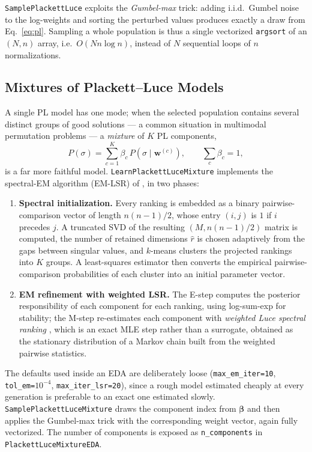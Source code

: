 \documentclass[a4paper,11pt]{article}
\begin{document}
\texttt{SamplePlackettLuce} exploits the \emph{Gumbel-max} trick: adding i.i.d.\
Gumbel noise to the log-weights and sorting the perturbed values produces exactly
a draw from Eq.~\eqref{eq:pl}.  Sampling a whole population is thus a single
vectorized \texttt{argsort} of an $(N,n)$ array, i.e.\ $O(Nn\log n)$, instead of
$N$ sequential loops of $n$ normalizations.

\subsection{Mixtures of Plackett--Luce Models}

A single PL model has one mode; when the selected population contains several
distinct groups of good solutions --- a common situation in multimodal
permutation problems --- a \emph{mixture} of $K$ PL components,
\begin{equation}
P(\sigma) = \sum_{c=1}^{K} \beta_c \, P(\sigma \mid \mathbf{w}^{(c)}), \qquad
\sum_c \beta_c = 1 ,
\end{equation}
is a far more faithful model.  \texttt{LearnPlackettLuceMixture} implements the
spectral-EM algorithm (EM-LSR) of \cite{Nguyen_and_Zhang:2023}, in two phases:

\begin{enumerate}
  \item \textbf{Spectral initialization.}  Every ranking is embedded as a binary
    pairwise-comparison vector of length $n(n-1)/2$, whose entry $(i,j)$ is $1$
    if $i$ precedes $j$.  A truncated SVD of the resulting $(M, n(n-1)/2)$ matrix
    is computed, the number of retained dimensions $\hat{r}$ is chosen adaptively
    from the gaps between singular values, and $k$-means clusters the projected
    rankings into $K$ groups.  A least-squares estimator then converts the
    empirical pairwise-comparison probabilities of each cluster into an initial
    parameter vector.
  \item \textbf{EM refinement with weighted LSR.}  The E-step computes the
    posterior responsibility of each component for each ranking, using
    log-sum-exp for stability; the M-step re-estimates each component with
    \emph{weighted Luce spectral ranking} \citep{Maystre_and_Grossglauser:2015},
    which is an exact MLE step rather than a surrogate, obtained as the
    stationary distribution of a Markov chain built from the weighted pairwise
    statistics.
\end{enumerate}

The defaults used inside an EDA are deliberately loose
(\texttt{max\_em\_iter=10}, \texttt{tol\_em=$10^{-4}$},
\texttt{max\_iter\_lsr=20}), since a rough model estimated cheaply at every
generation is preferable to an exact one estimated slowly.
\texttt{SamplePlackettLuceMixture} draws the component index from $\bm{\beta}$
and then applies the Gumbel-max trick with the corresponding weight vector,
again fully vectorized.  The number of components is exposed as
\texttt{n\_components} in \texttt{PlackettLuceMixtureEDA}.
\end{document}
